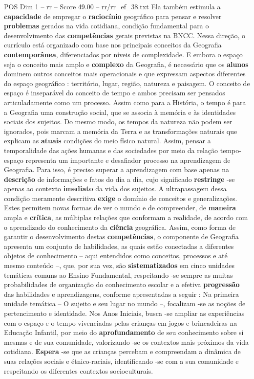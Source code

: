 \begin{textsample}{POS Dim 1 – rr – Score 49.00 – rr/rr\_ef\_38.txt}
Ela também estimula a \textbf{capacidade} de empregar o \textbf{raciocínio} geográfico para pensar e resolver \textbf{problemas} gerados na vida cotidiana, condição fundamental para o desenvolvimento das \textbf{competências} gerais previstas na BNCC.
Nessa direção, o currículo está organizado com base nos principais conceitos da Geografia \textbf{contemporânea}, diferenciados por níveis de complexidade.
E embora o espaço seja o conceito mais amplo e \textbf{complexo} da Geografia, é necessário que os \textbf{alunos} dominem outros conceitos mais operacionais e que expressam aspectos diferentes do espaço geográfico : território, lugar, região, natureza e paisagem.
O conceito de espaço é inseparável do conceito de tempo e ambos precisam ser pensados articuladamente como um processo.
Assim como para a História, o tempo é para a Geografia uma construção social, que se associa à memória e às identidades sociais dos sujeitos.
Do mesmo modo, os tempos da natureza não podem ser ignorados, pois marcam a memória da Terra e as transformações naturais que explicam as \textbf{atuais} condições do meio físico natural.
Assim, pensar a temporalidade das ações humanas e das sociedades por meio da relação tempo-espaço representa um importante e desafiador processo na aprendizagem de Geografia.
Para isso, é preciso superar a aprendizagem com base apenas na \textbf{descrição} de informações e fatos do dia a dia, cujo significado \textbf{restringe} -se apenas ao contexto \textbf{imediato} da vida dos sujeitos.
A ultrapassagem dessa condição meramente descritiva \textbf{exige} o domínio de conceitos e generalizações.
Estes permitem novas formas de ver o mundo e de compreender, de \textbf{maneira} ampla e \textbf{crítica}, as múltiplas relações que conformam a realidade, de acordo com o aprendizado do conhecimento da \textbf{ciência} geográfica.
Assim, como forma de garantir o desenvolvimento destas \textbf{competências}, o componente de Geografia apresenta um conjunto de habilidades, as quais estão conectadas a diferentes objetos de conhecimento – aqui entendidos como conceitos, processos e até mesmo conteúdo –, que, por sua vez, são \textbf{sistematizados} em cinco unidades temáticas comuns ao Ensino Fundamental, respeitando -se sempre as muitas probabilidades de organização do conhecimento escolar e a efetiva \textbf{progressão} das habilidades e aprendizagens, conforme apresentadas a seguir : Na primeira unidade temática – O sujeito e seu lugar no mundo –, focalizam -se as noções de pertencimento e identidade.
Nos Anos Iniciais, busca -se ampliar as experiências com o espaço e o tempo vivenciadas pelas crianças em jogos e brincadeiras na Educação Infantil, por meio do \textbf{aprofundamento} de seu conhecimento sobre si mesmas e de sua comunidade, valorizando -se os contextos mais próximos da vida cotidiana. \textbf{Espera} -se que as crianças percebam e compreendam a dinâmica de suas relações sociais e étnico-raciais, identificando -se com a sua comunidade e respeitando os diferentes contextos socioculturais.

\end{textsample}

